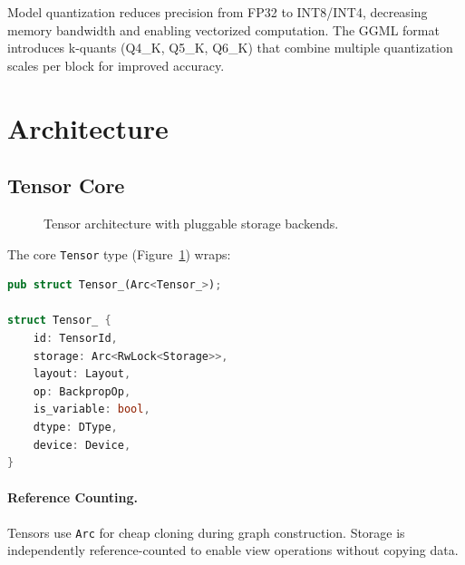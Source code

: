 \documentclass[11pt,twocolumn]{article}
\begin{document}
Model quantization reduces precision from FP32 to INT8/INT4, decreasing memory bandwidth and enabling vectorized computation. The GGML format~\cite{ggml2023} introduces k-quants (Q4\_K, Q5\_K, Q6\_K) that combine multiple quantization scales per block for improved accuracy.

\section{Architecture}

\subsection{Tensor Core}

\begin{figure}[t]
\centering
{}
\caption{Tensor architecture with pluggable storage backends.}
\label{fig:tensor}
\end{figure}

The core \texttt{Tensor} type (Figure~\ref{fig:tensor}) wraps:

\begin{lstlisting}[language=Rust]
pub struct Tensor_(Arc<Tensor_>);

struct Tensor_ {
    id: TensorId,
    storage: Arc<RwLock<Storage>>,
    layout: Layout,
    op: BackpropOp,
    is_variable: bool,
    dtype: DType,
    device: Device,
}
\end{lstlisting}

\paragraph{Reference Counting.} Tensors use \texttt{Arc} for cheap cloning during graph construction. Storage is independently reference-counted to enable view operations without copying data.
\end{document}
